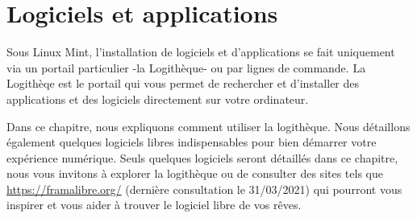 \documentclass[12pt]{book}
\begin{document}
\chapter{Logiciels et applications}\label{sec:logiciels}
Sous Linux Mint, l'installation de logiciels et d'applications se fait uniquement via un portail particulier -la Logithèque- ou par lignes de commande.
La Logithèqe est le portail qui vous permet de rechercher et d'installer des applications et des logiciels directement sur votre ordinateur.\par
Dans ce chapitre, nous expliquons comment utiliser la logithèque.
Nous détaillons également quelques logiciels libres indispensables pour bien démarrer votre expérience numérique.
Seuls quelques logiciels seront détaillés dans ce chapitre, nous vous invitons à explorer la logithèque ou de consulter des sites tels que \href{https://framalibre.org/}{https://framalibre.org/} (dernière consultation le 31/03/2021) qui pourront vous inspirer et vous aider à trouver le logiciel libre de vos rêves.
\end{document}
